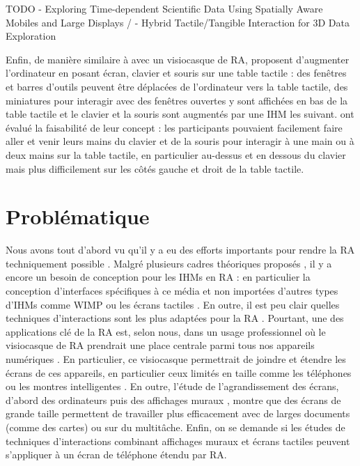TODO \cite{Sollich2016} - Exploring Time-dependent Scientific Data Using Spatially Aware Mobiles and Large Displays /
\cite{Besancon2017} - Hybrid Tactile/Tangible Interaction for 3D Data Exploration


Enfin, de manière similaire à \cite{Serrano2015} avec un visiocasque de RA, \cite{Bi2011} proposent d'augmenter l'ordinateur en posant écran, clavier et souris sur une table tactile  : des fenêtres et barres d'outils peuvent être déplacées de l'ordinateur vers la table tactile, des miniatures pour interagir avec des fenêtres ouvertes y sont affichées en bas de la table tactile et le clavier et la souris sont augmentés par une IHM les suivant. \citeauthor{Bi2011} ont évalué la faisabilité de leur concept : les participants pouvaient facilement faire aller et venir leurs mains du clavier et de la souris pour interagir à une main ou à deux mains sur la table tactile, en particulier au-dessus et en dessous du clavier mais plus difficilement sur les côtés gauche et droit de la table tactile.


\section{Problématique}
\label{sec:research_problem}

Nous avons tout d'abord vu qu'il y a eu des efforts importants pour rendre la RA techniquement possible \citep{Azuma2001, VanKrevelen2010}. Malgré plusieurs cadres théoriques proposés \citep{Milgram1994, Rekimoto1995, Bimber2005, Ens2014a}, il y a encore un besoin de conception pour les IHMs en RA \citep{Billinghurst2015} : en particulier la conception d'interfaces spécifiques à ce média et non importées d'autres types d'IHMs comme WIMP ou les écrans tactiles \citep{VanDam1997, Billinghurst2005}. En outre, il est peu clair quelles techniques d'interactions sont les plus adaptées pour la RA \citep{Argelaguet2013, Piumsomboon2013, Piumsomboon2014}. Pourtant, une des applications clé de la RA est, selon nous, dans un usage professionnel où le visiocasque de RA prendrait une place centrale parmi tous nos appareils numériques \citep{Rekimoto1995, Serrano2015}. En particulier, ce visiocasque permettrait de joindre et étendre les écrans de ces appareils, en particulier ceux limités en taille comme les téléphones ou les montres intelligentes \cite{Grubert2015}. En outre, l'étude de l'agrandissement des écrans, d'abord des ordinateurs \cite{Baudisch2002, Guiard2004} puis des affichages muraux \cite{Liu2014, Raedle2014}, montre que des écrans de grande taille permettent de travailler plus efficacement avec de larges documents (comme des cartes) ou sur du multitâche. Enfin, on se demande si les études de techniques d'interactions combinant affichages muraux et écrans tactiles \cite{Nancel2011, Berge2014} peuvent s'appliquer à un écran de téléphone étendu par RA.

